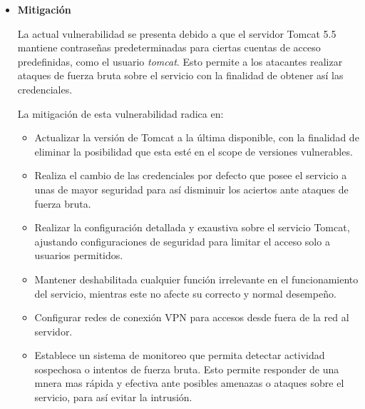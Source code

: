 \documentclass[12pt,oneside,a4paper]{book}
\begin{document}
\begin{enumerate}
\begin{itemize}
	\item 	\textbf{Mitigación}

\vspace{1em}

\hspace{20pt}
La actual vulnerabilidad se presenta debido a  que el servidor Tomcat 5.5 mantiene contraseñas predeterminadas para ciertas cuentas de acceso predefinidas, como el usuario \textit{tomcat}. Esto permite a los atacantes realizar ataques de fuerza bruta sobre el servicio con la finalidad de obtener así las credenciales.

\vspace{1em}

\hspace{20pt}
La mitigación de esta vulnerabilidad radica en:

\vspace{1em}

\begin{itemize}
\item Actualizar la versión de Tomcat  a la última disponible, con la finalidad de eliminar la posibilidad que esta esté en el scope de versiones vulnerables.
\item Realiza el cambio de las credenciales por defecto que posee el servicio a unas de mayor seguridad para así disminuir los aciertos ante ataques de fuerza bruta.
\item Realizar la configuración detallada y exaustiva sobre el servicio Tomcat, ajustando configuraciones de seguridad para limitar el acceso solo a usuarios permitidos. 
\item Mantener deshabilitada cualquier función irrelevante en el funcionamiento del servicio, mientras este no afecte su correcto y normal desempeño.
 \item  Configurar redes de conexión VPN para accesos desde fuera de la red al servidor.
\item Establece un sistema de monitoreo que permita detectar actividad sospechosa o intentos de fuerza bruta. Esto permite responder de una mnera mas rápida y efectiva ante posibles amenazas o ataques sobre el servicio, para así evitar la intrusión.
\end{itemize}
\end{itemize}

\end{enumerate}

\newpage
\end{document}
